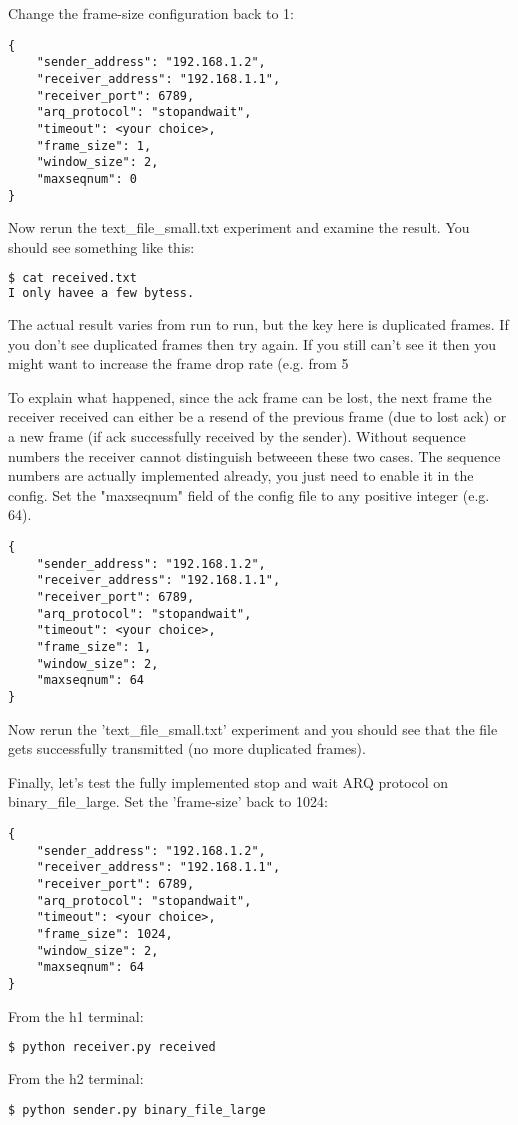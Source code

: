 \documentclass[11pt]{article}
\begin{document}
Change the frame-size configuration back to 1:
\begin{lstlisting}[caption={Configuration For Large File}]
{
    "sender_address": "192.168.1.2",
    "receiver_address": "192.168.1.1",
    "receiver_port": 6789,
    "arq_protocol": "stopandwait",
    "timeout": <your choice>,
    "frame_size": 1,
    "window_size": 2,
    "maxseqnum": 0
}
\end{lstlisting}
Now rerun the text\_file\_small.txt experiment and examine the result. You should see something like this:

\begin{lstlisting}[language=bash]
$ cat received.txt
I only havee a few bytess.
\end{lstlisting}
The actual result varies from run to run, but the key here is duplicated frames. If you don't see duplicated frames then try again. If you still can't see it then you might want to increase the frame drop rate (e.g. from 5%

To explain what happened, since the ack frame can be lost, the next frame the receiver received can either be a resend of the previous frame (due to lost ack) or a new frame (if ack successfully received by the sender). Without sequence numbers the receiver cannot distinguish betweeen these two cases. The sequence numbers are actually implemented already, you just need to enable it in the config. Set the "maxseqnum" field of the config file to any positive integer (e.g. 64).

\begin{lstlisting}[caption={Configuration For Large File}]
{
    "sender_address": "192.168.1.2",
    "receiver_address": "192.168.1.1",
    "receiver_port": 6789,
    "arq_protocol": "stopandwait",
    "timeout": <your choice>,
    "frame_size": 1,
    "window_size": 2,
    "maxseqnum": 64
}
\end{lstlisting}

Now rerun the 'text\_file\_small.txt' experiment and you should see that the file gets successfully transmitted (no more duplicated frames).

Finally, let's test the fully implemented stop and wait ARQ protocol on binary\_file\_large. Set the 'frame-size' back to 1024:

\begin{lstlisting}[caption={Configuration For Large File}]
{
    "sender_address": "192.168.1.2",
    "receiver_address": "192.168.1.1",
    "receiver_port": 6789,
    "arq_protocol": "stopandwait",
    "timeout": <your choice>,
    "frame_size": 1024,
    "window_size": 2,
    "maxseqnum": 64
}
\end{lstlisting}
From the h1 terminal:
\begin{lstlisting}[language=bash]
$ python receiver.py received
\end{lstlisting}
From the h2 terminal:
\begin{lstlisting}[language=bash]
$ python sender.py binary_file_large
\end{lstlisting}
\end{document}
